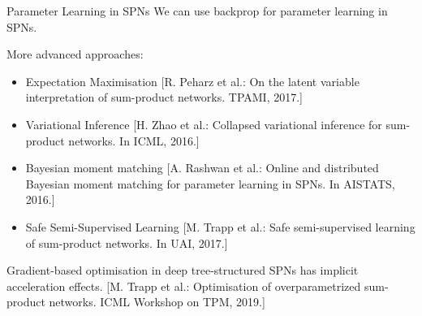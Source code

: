 
\begin{frame}{Parameter Learning in SPNs}{}
We can use backprop for parameter learning in SPNs.

More advanced approaches:
\begin{itemize}
    \item Expectation Maximisation {\scriptsize [R. Peharz et al.: On the latent variable interpretation of sum-product networks. TPAMI, 2017.]}
    \item Variational Inference {\scriptsize [H. Zhao et al.: Collapsed variational inference for sum-product networks. In ICML, 2016.]}
    \item Bayesian moment matching {\scriptsize [A. Rashwan et al.: Online and distributed Bayesian moment matching for parameter learning in SPNs. In AISTATS, 2016.]}
    \item Safe Semi-Supervised Learning {\scriptsize [M. Trapp et al.: Safe semi-supervised learning of sum-product networks. In UAI, 2017.]}
\end{itemize}

Gradient-based optimisation in deep tree-structured SPNs has implicit acceleration effects. {\scriptsize [M. Trapp et al.: Optimisation of overparametrized sum-product networks. ICML Workshop on TPM, 2019.]}
\end{frame}

